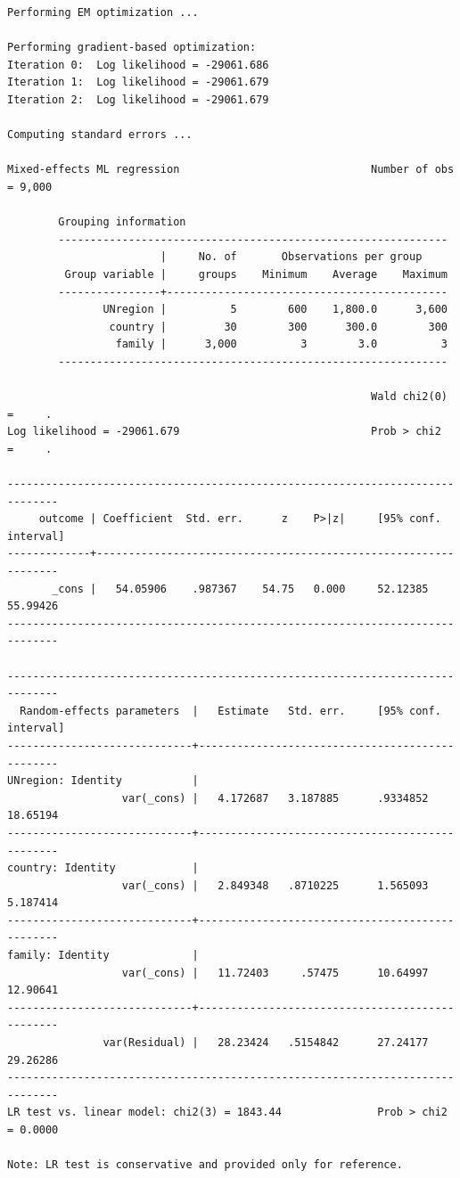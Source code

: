 \documentclass[
  letterpaper,
  DIV=11,
  numbers=noendperiod]{scrreprt}
\begin{document}
\begin{verbatim}
Performing EM optimization ...

Performing gradient-based optimization: 
Iteration 0:  Log likelihood = -29061.686  
Iteration 1:  Log likelihood = -29061.679  
Iteration 2:  Log likelihood = -29061.679  

Computing standard errors ...

Mixed-effects ML regression                              Number of obs = 9,000

        Grouping information
        -------------------------------------------------------------
                        |     No. of       Observations per group
         Group variable |     groups    Minimum    Average    Maximum
        ----------------+--------------------------------------------
               UNregion |          5        600    1,800.0      3,600
                country |         30        300      300.0        300
                 family |      3,000          3        3.0          3
        -------------------------------------------------------------

                                                         Wald chi2(0)  =     .
Log likelihood = -29061.679                              Prob > chi2   =     .

------------------------------------------------------------------------------
     outcome | Coefficient  Std. err.      z    P>|z|     [95% conf. interval]
-------------+----------------------------------------------------------------
       _cons |   54.05906    .987367    54.75   0.000     52.12385    55.99426
------------------------------------------------------------------------------

------------------------------------------------------------------------------
  Random-effects parameters  |   Estimate   Std. err.     [95% conf. interval]
-----------------------------+------------------------------------------------
UNregion: Identity           |
                  var(_cons) |   4.172687   3.187885      .9334852    18.65194
-----------------------------+------------------------------------------------
country: Identity            |
                  var(_cons) |   2.849348   .8710225      1.565093    5.187414
-----------------------------+------------------------------------------------
family: Identity             |
                  var(_cons) |   11.72403     .57475      10.64997    12.90641
-----------------------------+------------------------------------------------
               var(Residual) |   28.23424   .5154842      27.24177    29.26286
------------------------------------------------------------------------------
LR test vs. linear model: chi2(3) = 1843.44               Prob > chi2 = 0.0000

Note: LR test is conservative and provided only for reference.
\end{verbatim}
\end{document}
